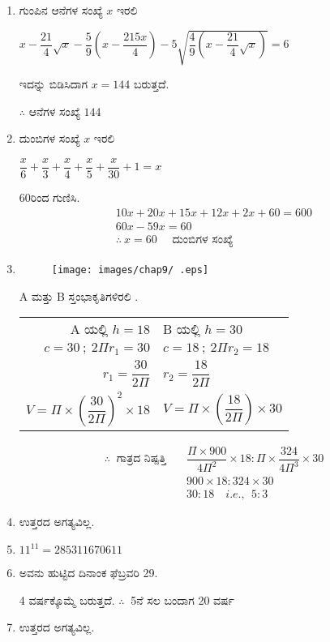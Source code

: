 \begin{enumerate}
\item ಗುಂಪಿನ ಆನೆಗಳ ಸಂಖ್ಯೆ $x$ ಇರಲಿ 

$x - \dfrac{21}{4} \sqrt{x} - \dfrac{5}{9} \left(x - \dfrac{215x}{4}\right) - 5 \sqrt{\dfrac{4}{9} \left(x - \dfrac{21}{4} \sqrt{x}\right)} = 6$

ಇದನ್ನು ಬಿಡಿಸಿದಾಗ $x = 144$ ಬರುತ್ತದೆ. 

$\therefore$ ಆನೆಗಳ ಸಂಖ್ಯೆ $144$

\item ದುಂಬಿಗಳ ಸಂಖ್ಯೆ $x$ ಇರಲಿ 

$\dfrac{x}{6} + \dfrac{x}{3} + \dfrac{x}{4} + \dfrac{x}{5} + \dfrac{x}{30} + 1 = x$

60ರಿಂದ ಗುಣಿಸಿ. 
\begin{gather*}
10x + 20x + 15x + 12x + 2x + 60 = 600\\
60x - 59x = 60\\
\therefore~ x = 60 \quad\text{ ದುಂಬಿಗಳ ಸಂಖ್ಯೆ}
\end{gather*}

\item 
\begin{figure}[!h]
\centering
\texttt{[image: images/chap9/ .eps]}
\end{figure}

A ಮತ್ತು B ಸ್ತಂಭಾಕೃತಿಗಳಿರಲಿ . 

\begin{tabular}[t]{rl}
A ಯಲ್ಲಿ \quad $h = 18$ & B ಯಲ್ಲಿ \quad $h = 30$\\
$c = 30 ~;~ 2\Pi r_{1} = 30$  & $c = 18 ~;~ 2\Pi r_{2} = 18$\\
$r_{1} = \dfrac{30}{2\Pi}$ & $r_{2} = \dfrac{18}{2\Pi}$\\
$V = \Pi\times \left(\dfrac{30}{2\Pi}\right)^{2} \times 18$ & $V = \Pi\times \left(\dfrac{18}{2\Pi}\right) \times 30$
\end{tabular}

\begin{equation*}
\begin{split}
\therefore~ \text{ ಗಾತ್ರದ ನಿಷ್ಪತ್ತಿ}\quad & \dfrac{\Pi\times 900}{4\Pi^{2}} \times 18 : \Pi \times \dfrac{324}{4\Pi^{3}} \times 30\\
& 900\times 18 : 324\times 30\\
& 30 : 18\quad i.e.,~~ 5:3
\end{split}
\end{equation*}

\item ಉತ್ತರದ ಅಗತ್ಯವಿಲ್ಲ. 

\item $11^{11} = 285311670611$

\item ಅವನು ಹುಟ್ಟಿದ ದಿನಾಂಕ ಫೆಬ್ರವರಿ 29. 

4 ವರ್ಷಕ್ಕೊಮ್ಮೆ ಬರುತ್ತದೆ.  $\therefore~$ 5ನೆ ಸಲ ಬಂದಾಗ 20 ವರ್ಷ 

\item ಉತ್ತರದ ಅಗತ್ಯವಿಲ್ಲ. 
\end{enumerate}
